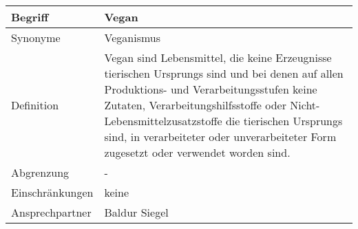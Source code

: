 \begin{table}[H]
    \centering
    \label{gls:vegan}
    \begin{tabularx}{\textwidth}{| l | X |}
        \hline
        Begriff         & Vegan                                                                                                                                                                                                                                                                                                                             \\
        \hline
        Synonyme        & Veganismus                                                                                                                                                                                                                                                                                                                        \\
        \hline
        Definition      & Vegan sind Lebensmittel, die keine Erzeugnisse tierischen Ursprungs sind und bei denen auf allen Produktions- und Verarbeitungsstufen keine Zutaten, Verarbeitungshilfsstoffe oder Nicht-Lebensmittelzusatzstoffe die tierischen Ursprungs sind, in verarbeiteter oder unverarbeiteter Form zugesetzt oder verwendet worden sind. \\
        \hline
        Abgrenzung      & -                                                                                                                                                                                                                                                                                                                                 \\
        \hline
        Einschränkungen & keine                                                                                                                                                                                                                                                                                                                             \\
        \hline
        Ansprechpartner & Baldur Siegel                                                                                                                                                                                                                                                                                                                     \\

\end{tabularx}
\end{table}
